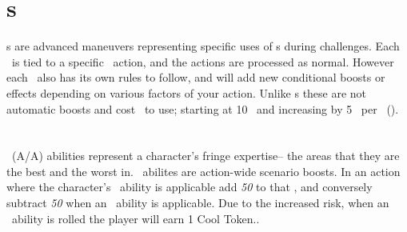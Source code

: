 \section{\techn s\index{\techn}}\label{sec:techniques}
\techn s are advanced maneuvers representing specific uses of \attribute s during challenges. Each \techn\ is tied to a specific \attribute\ action, and the actions are processed as normal. However each \techn\ also has its own rules to follow, and will add new conditional boosts or effects depending on various factors of your action. Unlike \skill s these are not automatic boosts and cost \ENful\ to use; starting at 10 \EN\ and increasing by 5 \EN\ per \advancement\ (\advanmini). 


\section{\AWEAWF{}}\label{sec:aweawf}
\AWEAWF\ (A/A) abilities represent a character's fringe expertise-- the areas that they are the best and the worst in. \AWEAWF\ abilites are action-wide scenario boosts. In an action where the character's \AWE\ ability is applicable add \emph{50} to that \attribute , and conversely subtract \emph{50} when an \AWF\ ability is applicable. Due to the increased risk, when an \AWF\ ability is rolled the player will earn 1 Cool Token.. 



